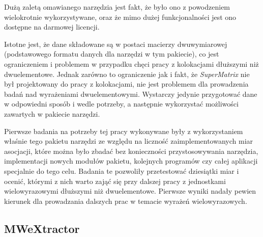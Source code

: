 \documentclass[11pt,a4paper]{llncs}
\begin{document}
Dużą zaletą omawianego narzędzia jest fakt, że było ono z powodzeniem wielokrotnie wykorzystywane, oraz że mimo dużej funkcjonalności jest ono dostępne na darmowej licencji.



Istotne jest, że dane składowane są w postaci macierzy dwuwymiarowej (podstawowego formatu danych dla narzędzi w tym pakiecie), co jest ograniczeniem i problemem w przypadku chęci pracy z kolokacjami dłuższymi niż dwuelementowe. 
Jednak zarówno to ograniczenie jak i fakt, że \emph{SuperMatrix} nie był projektowany do pracy z kolokacjami, nie jest problemem dla prowadzenia badań nad wyrażeniami dwuelementowymi. 
Wystarczy jedynie przygotować dane w odpowiedni sposób i wedle potrzeby, a następnie wykorzystać możliwości zawartych w pakiecie narzędzi.



Pierwsze badania na potrzeby tej pracy wykonywane były z wykorzystaniem właśnie tego pakietu narzędzi ze względu na liczność zaimplementowanych miar asocjacji, które można było zbadać bez konieczności przystosowywania narzędzia, implementacji nowych modułów pakietu, kolejnych programów czy całej aplikacji specjalnie do tego celu.
Badania te pozwoliły przetestować dziesiątki miar i ocenić, którymi z nich warto zająć się przy dalszej pracy z jednostkami wielowyrazowymi dłuższymi niż dwuelementowe.
Pierwsze wyniki nadały pewien kierunek dla prowadzania dalszych prac w temacie wyrażeń wielowyrazowych.


\subsection{MWeXtractor}
\end{document}
